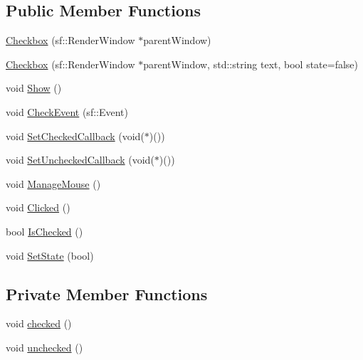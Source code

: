 \subsection*{Public Member Functions}
\begin{CompactItemize}
\item 
\hyperlink{classsfgui_1_1Checkbox_72e99b59f2cd8182a205f4040bedc5c7}{Checkbox} (sf::RenderWindow $\ast$parentWindow)
\item 
\hyperlink{classsfgui_1_1Checkbox_61f0b87c25055871c7900bf711a1adff}{Checkbox} (sf::RenderWindow $\ast$parentWindow, std::string text, bool state=false)
\item 
void \hyperlink{classsfgui_1_1Checkbox_0028c58d4579845c1bdf3cae7ec9af5a}{Show} ()
\item 
void \hyperlink{classsfgui_1_1Checkbox_d618a9010bef60b8ea2f11f893320fb8}{CheckEvent} (sf::Event)
\item 
void \hyperlink{classsfgui_1_1Checkbox_87db2a071f8c0bb8dd8124a2ff22940b}{SetCheckedCallback} (void($\ast$)())
\item 
void \hyperlink{classsfgui_1_1Checkbox_327bd2236295963fa29cc482d89bba33}{SetUncheckedCallback} (void($\ast$)())
\item 
void \hyperlink{classsfgui_1_1Checkbox_a49cffa3e2bef0e96105cd9a9103e294}{ManageMouse} ()
\item 
void \hyperlink{classsfgui_1_1Checkbox_9dc5f05d2f6d960d9fd50c77be3b7d6f}{Clicked} ()
\item 
bool \hyperlink{classsfgui_1_1Checkbox_d38e389867fdfdc63d2c05955c9a2e72}{IsChecked} ()
\item 
void \hyperlink{classsfgui_1_1Checkbox_f5e56a1a1c49ff8437118061f709871b}{SetState} (bool)
\end{CompactItemize}
\subsection*{Private Member Functions}
\begin{CompactItemize}
\item 
void \hyperlink{classsfgui_1_1Checkbox_79ad5f7de619782ce22c3657e82ce077}{checked} ()
\item 
void \hyperlink{classsfgui_1_1Checkbox_f593cc2c1b79231410a2b2f5d70ef034}{unchecked} ()
\end{CompactItemize}
